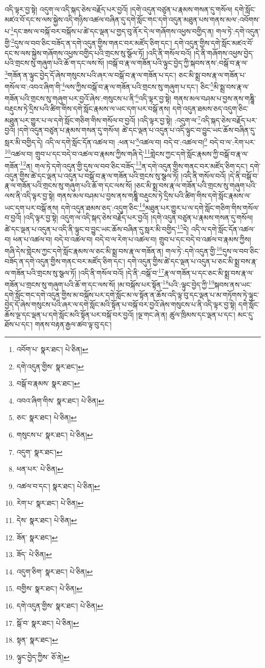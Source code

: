 འདི་ལྟར་བྱ་སྟེ། འདུག་ལ་འདི་སྐད་ཅེས་བརྗོད་པར་བྱའོ། །དགེ་འདུན་བཙུན་པ་རྣམས་གསན་དུ་གསོལ། དགེ་སློང་མཛའ་བོ་དང་ས་ལས་སྐྱེས་འདི་གཉིས་འཚལ་བཞིན་དུ་དགེ་སློང་གང་དགེ་འདུན་མཐུན་པས་གནས་མལ་:འབོགས་པ་\footnote{འབོག་པ་  སྣར་ཐང་།  པེ་ཅིན། }དང་ཟས་ལ་བསྐོ་བར་བསྐོས་པ་ཚེ་དང་ལྡན་པ་གྱད་བུ་ནོར་དེ་ལ་གཞོགས་འཕྱས་བགྱིད་ན། གལ་ཏེ་:དགེ་འདུན་གྱི་\footnote{དགེ་འདུན་གྱིས་  སྣར་ཐང་། }དུས་ལ་བབ་ཅིང་བཟོད་ན་དགེ་འདུན་གྱིས་གནང་བར་མཛོད་ཅིག་དང་། དགེ་འདུན་གྱིས་དགེ་སློང་མཛའ་བོ་དང་ས་ལས་སྐྱེས་གཞོགས་འཕྱས་བགྱིད་པའི་གྲངས་སུ་སྩོལ་ཏོ། །འདི་ནི་གསོལ་བའོ། །དེ་ནི་གཞོགས་འཕྱས་བྱེད་པའི་གྲངས་སུ་གཞུག་པའི་ཆོ་ག་དང་ལས་སོ། །བསྒོ་བ་རྣ་ལ་གཟོན་པའི་ལྟུང་བྱེད་ཀྱི་སྐབས་ནས་:བསྒོ་བ་རྣ་ལ་\footnote{བསྒོ་བ་རྣམས་  སྣར་ཐང་། }གཟོན་ན་ལྟུང་བྱེད་དོ་ཞེས་གསུངས་པའི་ཞར་ལ་བསྒོ་བ་རྣ་ལ་གཟོན་པ་དང་། ཅང་མི་སྨྲ་བས་རྣ་ལ་གཟོན་པ་གསོལ་བ་:འབའ་ཞིག་གི་\footnote{འབའ་ཞིག་གིས་  སྣར་ཐང་།  པེ་ཅིན། }ལས་ཀྱིས་བསྒོ་བ་རྣ་ལ་གཟོན་པའི་གྲངས་སུ་གཞུག་པ་དང་། ཅིང་\footnote{ཅང་  སྣར་ཐང་།  པེ་ཅིན། }མི་སྨྲ་བས་རྣ་ལ་གཟོན་པའི་གྲངས་སུ་གཞུག་པར་བྱའོ་ཞེས་:གསུངས་པ་ནི་\footnote{གསུངས་པ་  སྣར་ཐང་།  པེ་ཅིན། }འདི་ལྟར་བྱ་སྟེ། གནས་མལ་བཤམ་པ་བྱས་ནས་གཎྜཱི་བརྡུངས་ཏེ་དྲིས་པའི་ཚིག་གིས་དགེ་སློང་རྣམས་ལ་ཡང་དག་པར་བསྒོ་ནས། དགེ་འདུན་ཐམས་ཅད་འདུག་ཅིང་མཐུན་པར་གྱུར་པ་ལ་དགེ་སློང་གཅིག་གིས་གསོལ་བ་བྱའོ། །འདི་ལྟར་བྱ་སྟེ། :འདུག་ལ་\footnote{འདུག་  སྣར་ཐང་། }འདི་སྐད་ཅེས་བརྗོད་པར་བྱའོ། །དགེ་འདུན་བཙུན་པ་རྣམས་གསན་དུ་གསོལ། ཚེ་དང་ལྡན་པ་འདུན་པ་འདི་ལྟུང་བ་བྱུང་ཡང་ཆོས་བཞིན་དུ་སླར་མི་བགྱིད་དེ། འདི་ལ་དགེ་སློང་དོན་འཚལ་བ། :ཕན་པ་\footnote{ཕན་པར་  པེ་ཅིན། }འཚལ་བ། བདེ་བ་:འཚལ་བ།\footnote{འཚལ་བ་དང་།  སྣར་ཐང་།  པེ་ཅིན། } བདེ་བ་ལ་:རེག་པར་\footnote{རེག་པ་  སྣར་ཐང་།  པེ་ཅིན། }འཚལ་བ། གྲུབ་པ་དང་བདེ་བ་འཚལ་བ་རྣམས་ཀྱིས་གཞི་དེ་\footnote{དེས་  སྣར་ཐང་།  པེ་ཅིན། }གླེངས་ཀྱང་དགེ་སློང་རྣམས་ཀྱི་བསྒོ་བ་རྣ་ལ་གཟོན་\footnote{ཟོན་  སྣར་ཐང་། }ན། གལ་ཏེ་དགེ་འདུན་གྱི་དུས་ལ་བབ་ཅིང་བཟོད་\footnote{ཟོད་  པེ་ཅིན། }ན་དགེ་འདུན་གྱིས་གནང་བར་མཛོད་ཅིག་དང་། དགེ་འདུན་གྱིས་ཚེ་དང་ལྡན་པ་འདུན་པ་བསྒོ་བ་རྣ་ལ་གཟོན་པའི་གྲངས་སུ་སྩལ་ཏོ། །འདི་ནི་གསོལ་བའོ། །དེ་ནི་བསྒོ་བ་རྣ་ལ་གཟོན་པའི་གྲངས་སུ་གཞུག་པའི་ཆོ་ག་དང་ལས་སོ། །ཅང་མི་སྨྲ་བས་རྣ་ལ་གཟོན་པའི་གྲངས་སུ་གཞུག་པའི་ལས་ནི་འདི་ལྟར་བྱ་སྟེ། གནས་མལ་བཤམ་པ་བྱས་ནས་གཎྜཱི་བརྡུངས་ཏེ་དྲིས་པའི་ཚིག་གིས་དགེ་སློང་རྣམས་ལ་ཡང་དག་པར་བསྒོ་ནས། དགེ་འདུན་ཐམས་ཅད་:འདུག་ཅིང་\footnote{འདུག་ཅིག་  སྣར་ཐང་།  པེ་ཅིན། }མཐུན་པར་གྱུར་པ་ལ་དགེ་སློང་གཅིག་གིས་གསོལ་བ་བྱའོ། །འདི་ལྟར་བྱ་སྟེ། འདུག་ལ་འདི་སྐད་ཅེས་བརྗོད་པར་བྱའོ། །དགེ་འདུན་བཙུན་པ་རྣམས་གསན་དུ་གསོལ། ཚེ་དང་ལྡན་པ་འདུན་པ་འདི་ནི་ལྟུང་བ་བྱུང་ཡང་ཆོས་བཞིན་དུ་སླར་མི་བགྱིད་\footnote{བགྱིས་  སྣར་ཐང་།  པེ་ཅིན། }དེ། འདི་ལ་དགེ་སློང་དོན་འཚལ་བ། ཕན་པ་འཚལ་བ། བདེ་བ་འཚལ་བ། བདེ་བ་ལ་རེག་པ་འཚལ་བ། གྲུབ་པ་དང་བདེ་བ་འཚལ་བ་རྣམས་ཀྱིས། གཞི་དེས་གླེངས་ཀྱང་དགེ་སློང་རྣམས་ལ་ཅང་མི་སྨྲ་བས་རྣ་ལ་གཟོན་ན། གལ་ཏེ་:དགེ་འདུན་གྱི་\footnote{དགེ་འདུན་གྱིས་  སྣར་ཐང་།  པེ་ཅིན། }དུས་ལ་བབ་ཅིང་བཟོད་ན་དགེ་འདུན་གྱིས་གནང་བར་མཛོད་ཅིག་དང་། དགེ་འདུན་གྱིས་ཚེ་དང་ལྡན་པ་འདུན་པ་ཅང་མི་སྨྲ་བས་རྣ་ལ་གཟོན་པའི་གྲངས་སུ་སྩལ་ཏོ། །འདི་ནི་གསོལ་བའོ། །དེ་ནི་:བསྒོ་བ་\footnote{སྒོ་བ་  སྣར་ཐང་།  པེ་ཅིན། }རྣ་ལ་གཟོན་པ་དང་ཅང་མི་སྨྲ་བས་རྣ་ལ་གཟོན་པ་གྲངས་སུ་གཞུག་པའི་ཆོ་ག་དང་ལས་སོ། །མ་བསྐོས་པར་སྟོན་\footnote{སྟན་  སྣར་ཐང་། }པའི་:ལྟུང་བྱེད་ཀྱི་\footnote{ལྟུང་བྱེད་ཀྱིས་  ཅོ་ནེ། }སྐབས་ནས་ཡང་དགེ་སློང་གང་དགེ་འདུན་གྱིས་མ་བསྐོས་པར་དགེ་སློང་མ་ལ་སྟོན་ན་ཆོས་འདི་ལྟ་བུ་དང་ལྡན་པ་མ་གཏོགས་ཏེ་ལྟུང་བྱེད་དོ་ཞེས་གསུངས་པའི་ཞར་ལ་དགེ་སློང་མའི་སྟོན་པ་བསྐོ་བར་བྱའོ་ཞེས་གསུངས་པ་ནི་འདི་ལྟར་བྱ་སྟེ། དགེ་སློང་ཆོས་ལྔ་དང་ལྡན་པ་དགེ་སློང་མའི་སྟོན་པར་བསྐོ་བར་བྱའོ། །ལྔ་གང་ཞེ་ན། ཚུལ་ཁྲིམས་དང་ལྡན་པ་དང་། མང་དུ་ཐོས་པ་དང་། གནས་བརྟན་རྒྱལ་ཚབ་ལྟ་བུ་དང་། 
